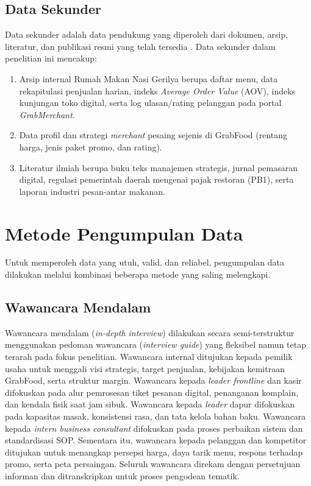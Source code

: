 \subsection{Data Sekunder}
Data sekunder adalah data pendukung yang diperoleh dari dokumen, arsip, literatur, dan publikasi resmi yang telah tersedia \parencite{flick2018designingqualitative}. Data sekunder dalam penelitian ini mencakup:
\begin{enumerate}
    \item Arsip internal Rumah Makan Nasi Gerilya berupa daftar menu, data rekapitulasi penjualan harian, indeks \textit{Average Order Value} (AOV), indeks kunjungan toko digital, serta log ulasan/rating pelanggan pada portal \textit{GrabMerchant}.
    \item Data profil dan strategi \textit{merchant} pesaing sejenis di GrabFood (rentang harga, jenis paket promo, dan rating).
    \item Literatur ilmiah berupa buku teks manajemen strategis, jurnal pemasaran digital, regulasi pemerintah daerah mengenai pajak restoran (PB1), serta laporan industri pesan-antar makanan.
\end{enumerate}

\section{Metode Pengumpulan Data}
\label{sec:bab3-metode-pengumpulan-data}
Untuk memperoleh data yang utuh, valid, dan reliabel, pengumpulan data dilakukan melalui kombinasi beberapa metode yang saling melengkapi.

\subsection{Wawancara Mendalam}
Wawancara mendalam (\textit{in-depth interview}) dilakukan secara semi-terstruktur menggunakan pedoman wawancara (\textit{interview guide}) yang fleksibel namun tetap terarah pada fokus penelitian. Wawancara internal ditujukan kepada pemilik usaha untuk menggali visi strategis, target penjualan, kebijakan kemitraan GrabFood, serta struktur margin. Wawancara kepada \textit{leader frontline} dan kasir difokuskan pada alur pemrosesan tiket pesanan digital, penanganan komplain, dan kendala fisik saat jam sibuk. Wawancara kepada \textit{leader} dapur difokuskan pada kapasitas masak, konsistensi rasa, dan tata kelola bahan baku. Wawancara kepada \textit{intern business consultant} difokuskan pada proses perbaikan sistem dan standardisasi SOP. Sementara itu, wawancara kepada pelanggan dan kompetitor ditujukan untuk menangkap persepsi harga, daya tarik menu, respons terhadap promo, serta peta persaingan. Seluruh wawancara direkam dengan persetujuan informan dan ditranskripkan untuk proses pengodean tematik.

